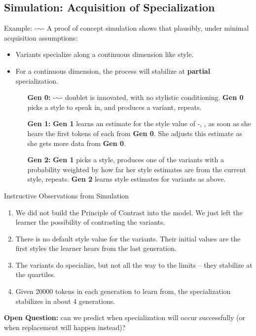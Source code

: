 \documentclass[hyperref={pdfpagelabels=false}]{beamer}
\begin{document}
\subsection{Simulation: Acquisition of Specialization}
\begin{frame}{Example: -$\sim$-}
	A proof of concept simulation shows that plausibly, under minimal acquisition assumptions:
	\begin{itemize}
	\item Variants specialize along a continuous dimension like style.
	\item For a continuous dimension, the process will stabilize at \textbf{partial} specialization. 
	\item[ ] \begin{itemize}
		\item[\textbf{Gen 0:}]  -$\sim$- doublet is innovated, with no stylistic conditioning. \textbf{Gen 0} picks a style to speak in, and produces a variant, repeats. 
		\item[\textbf{Gen 1:}]  \textbf{Gen 1} learns an estimate for the style value of -, , as soon as she hears the first tokens of each from \textbf{Gen 0}. She adjusts this estimate as she gets more data from \textbf{Gen 0}.
		\item[\textbf{Gen 2:}] \textbf{Gen 1} picks a style, produces one of the variants with a probability weighted by how far her style estimates are from the current style, repeats. \textbf{Gen 2} learns style estimates for variants as above.
	\end{itemize}
	\end{itemize}
\end{frame}


%

\begin{frame}{Instructive Observations from Simulation}
\begin{enumerate}
	\item We did not build the Principle of Contrast into the model. We just left the learner the possibility of contrasting the variants.
	\item There is no default style value for the variants. Their initial values are the first styles the learner hears from the last generation.
	\item The variants do specialize, but not all the way to the limits -- they stabilize at the quartiles.
	\item Given 20000 tokens in each generation to learn from, the specialization stabilizes in about 4 generations.%
\end{enumerate}
	\textbf{Open Question:} can we predict when specialization will occur successfully (or when replacement will happen instead)?
\end{frame}
\end{document}
